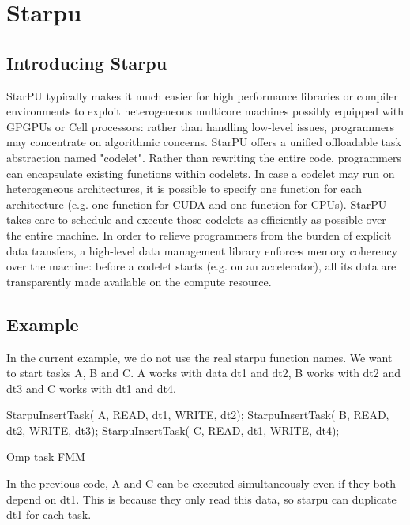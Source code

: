 \documentclass[12pt,letterpaper,titlepage]{report}
\begin{document}
\chapter{Starpu}
\section{Introducing Starpu}
StarPU typically makes it much easier for high performance libraries or compiler environments to exploit heterogeneous multicore machines possibly equipped with GPGPUs or Cell processors: rather than handling low-level issues, programmers may concentrate on algorithmic concerns.
StarPU offers a unified offloadable task abstraction named "codelet". Rather than rewriting the entire code, programmers can encapsulate existing functions within codelets. In case a codelet may run on heterogeneous architectures, it is possible to specify one function for each architecture (e.g. one function for CUDA and one function for CPUs). StarPU takes care to schedule and execute those codelets as efficiently as possible over the entire machine. In order to relieve programmers from the burden of explicit data transfers, a high-level data management library enforces memory coherency over the machine: before a codelet starts (e.g. on an accelerator), all its data are transparently made available on the compute resource.

\section{Example}
In the current example, we do not use the real starpu function names.
We want to start tasks A, B and C. A works with data dt1 and dt2, B works with dt2 and dt3 and C works with dt1 and dt4.
\begin{algorithm}[H]
\linesnumbered
\SetLine
\BlankLine
StarpuInsertTask( A, READ, dt1, WRITE, dt2);
StarpuInsertTask( B, READ, dt2, WRITE, dt3);
StarpuInsertTask( C, READ, dt1, WRITE, dt4);
\BlankLine
\caption{Omp task FMM}
\end{algorithm}
\BlankLine
In the previous code, A and C can be executed simultaneously even if they both depend on dt1.
This is because they only read this data, so starpu can duplicate dt1 for each task.

\end{document}
